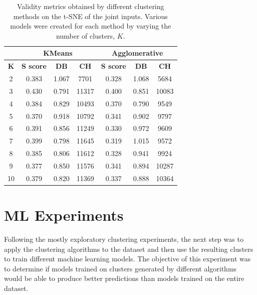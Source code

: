 \begin{table}[h]
    \caption[Validity metrics for t-SNE of the Joint Inputs]{Validity metrics obtained by different clustering methods on the t-SNE of the joint inputs. Various models were created for each method by varying the number of clusters, $K$.}\label{tab:tsne_joint}
    \begin{tabular}{@{}cccc|ccc@{}}
    \cmidrule(l){2-7}
                                    & \multicolumn{3}{c|}{\textbf{KMeans}}         & \multicolumn{3}{c}{\textbf{Agglomerative}}   \\ \midrule
    \multicolumn{1}{c|}{\textbf{K}} & \textbf{S score} & \textbf{DB} & \textbf{CH} & \textbf{S score} & \textbf{DB} & \textbf{CH} \\ \midrule
    \multicolumn{1}{c|}{2}          & 0.383            & 1.067       & 7701    & 0.328            & 1.068       & 5684    \\
    \multicolumn{1}{c|}{3}          & 0.430            & 0.791       & 11317   & 0.400            & 0.851       & 10083   \\
    \multicolumn{1}{c|}{4}          & 0.384            & 0.829       & 10493   & 0.370            & 0.790       & 9549    \\
    \multicolumn{1}{c|}{5}          & 0.370            & 0.918       & 10792   & 0.341            & 0.902       & 9797    \\
    \multicolumn{1}{c|}{6}          & 0.391            & 0.856       & 11249   & 0.330            & 0.972       & 9609    \\
    \multicolumn{1}{c|}{7}          & 0.399            & 0.798       & 11645   & 0.319            & 1.015       & 9572    \\
    \multicolumn{1}{c|}{8}          & 0.385            & 0.806       & 11612   & 0.328            & 0.941       & 9924    \\
    \multicolumn{1}{c|}{9}          & 0.377            & 0.850       & 11576   & 0.341            & 0.894       & 10287   \\
    \multicolumn{1}{c|}{10}         & 0.379            & 0.820       & 11369   & 0.337            & 0.888       & 10364   \\ \bottomrule
    \end{tabular}
    \end{table}

\section{ML Experiments}\label{sec:clustering_ml_experiments}
Following the mostly exploratory clustering experiments, the next step was to apply the clustering algorithms to the dataset and then use the resulting clusters to train different machine learning models. The objective of this experiment was to determine if models trained on clusters generated by different algorithms would be able to produce better predictions than models trained on the entire dataset. 

